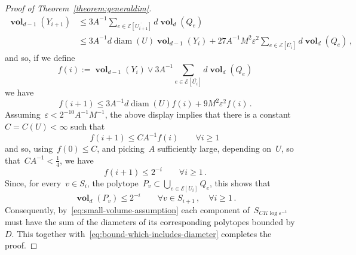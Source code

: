 \documentclass[12pt]{amsart}
\numberwithin{equation}{section}
\DeclareMathOperator{\diam}{{\mathop{diam}}}
\newcommand{\E}{\mathcal{E}}
\newcommand{\eps}{\varepsilon}
\newcommand{\Qe}{\hyperref[eq:qeset]{Q_e}}
\DeclareMathOperator{\vol}{\mathbf{vol}}
\begin{document}
\begin{proof}[Proof of Theorem~\ref{theorem:generaldim}]
	\begin{equation*}
	\label{eq:vol-bound-by-qe}
	\begin{aligned}
	\vol_{d-1} \left( Y_{i+1}  \right)  &\leq {3 A^{-1}} \sum_{e \in {\E[\overline{U_{i+1}}]}} d   \vol_{d}(\Qe) \\
	&\leq {3 A^{-1}} d \diam(U) \vol_{d-1} \left( Y_{i}  \right)
	+ {27 A^{-1} M^2 \eps^{2}} \sum_{e \in \E[\overline{U_{i}}]} d   \vol_{d}(\Qe)  \, , 
	\end{aligned}
\end{equation*}
	and so, if we define 
	\[
	f(i) :=  \vol_{d-1}(Y_i) \vee  {3 A^{-1}} \sum_{e \in \E[\overline{U_i}]} d   \vol_{d}(\Qe)
	\]
	we have 
	\[
	f(i+1) \leq {3 A^{-1}} d \diam(U) f(i) + 9 M^2 \eps^2 f(i) \, . 
	\]
	Assuming~$\eps < 2^{-10} A^{-1} M^{-1}$, the above display implies that there is a constant~$C=C(U) < \infty$ such that
	\[
	f(i+1) \leq C {A^{-1}} f(i) \qquad \forall i \geq 1 \, 
	\]
	and so, using~$f(0) \leq C$, and picking~$A$ sufficiently large, depending on~$U$, so that~$C A^{-1} < \frac14$, we have
	\begin{equation}
		\label{eq:geometric-bound-during-iteration}
	{f(i+1) \leq 2^{-i} \qquad \forall i \geq 1} \, . 
	\end{equation}
	Since, for every~$v \in S_i$, the polytope~$P_v \subset \bigcup_{e \in \E[U_i]} \Qe$, this shows that 
	\[
	\vol_{d}(P_v) \leq  2^{-i} \qquad \forall v \in S_{i+1} \, ,  \quad \forall i \geq 1 \, . 
	\]
	Consequently, by~\eqref{eq:small-volume-assumption} each component of~$S_{C K \log \eps^{-1}}$ must have the sum of the diameters of its corresponding polytopes bounded by~$D$. This together with~\eqref{eq:bound-which-includes-diameter} completes the proof. 
\end{proof}
\end{document}
